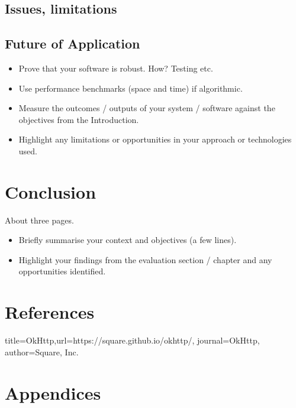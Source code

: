 \section{Issues, limitations}
\section{Future of Application}
\begin{itemize}
\item Prove that your software is robust. How? Testing etc.
\item Use performance benchmarks (space and time) if algorithmic.
\item Measure the outcomes / outputs of your system / software against the objectives from the Introduction.
\item Highlight any limitations or opportunities in your approach or technologies used.
\end{itemize}
\chapter{Conclusion}
About three pages.
\begin{itemize}
\item Briefly summarise your context and objectives (a few lines).
\item Highlight your findings from the evaluation section / chapter and any opportunities identified.
\end{itemize}
\chapter{References}

\begin{thebibliography}{9}
 {title={OkHttp},url={https://square.github.io/okhttp/}, journal={OkHttp}, author={Square, Inc.}}

\end{thebibliography}
\chapter{Appendices}
